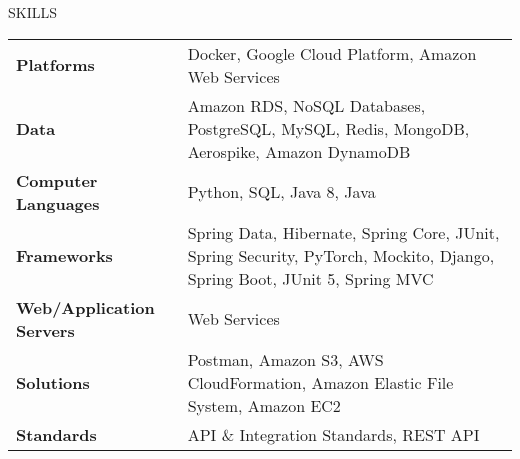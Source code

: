 \documentclass{resume} %
\begin{document}
\begin{rSection}{SKILLS}

\begin{tabular}{ @{} >{\bfseries}l @{\hspace{6ex}} p{} }
Platforms & Docker, Google Cloud Platform, Amazon Web Services \\
Data & Amazon RDS, NoSQL Databases, PostgreSQL, MySQL, Redis, MongoDB, Aerospike, Amazon DynamoDB \\
Computer Languages & Python, SQL, Java 8, Java \\
Frameworks & Spring Data, Hibernate, Spring Core, JUnit, Spring Security, PyTorch, Mockito, Django, Spring Boot, JUnit 5, Spring MVC \\
Web/Application Servers & Web Services \\
Solutions & Postman, Amazon S3, AWS CloudFormation, Amazon Elastic File System, Amazon EC2 \\
Standards & API \& Integration Standards, REST API \\
\end{tabular}\\
\end{rSection}
\end{document}
